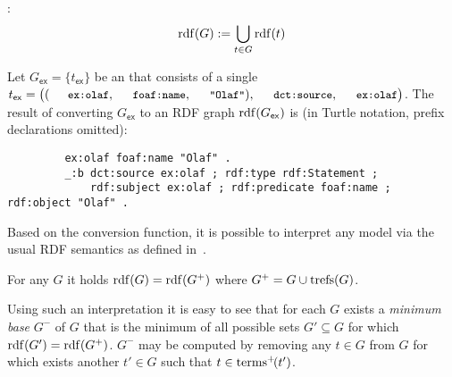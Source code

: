 \noindent
{}:
\begin{equation*}
	\mathrm{rdf}(G) := \bigcup_{t \in G} \mathrm{rdf}(t)
\end{equation*}

\begin{example} \label{Example:ConvertingRDFplusToRDF}
	Let $G_\mathsf{ex} = \lbrace t_\mathsf{ex} \rbrace$ be an {\RDFplusGraph} that consists of a single {\RDFplusTriple} $t_\mathsf{ex} = \bigl( (\mathTinyRDF{ex:olaf},\mathTinyRDF{foaf:name},\mathTinyRDF{"Olaf"}), \mathTinyRDF{dct:source}, \mathTinyRDF{ex:olaf} \bigr)$.
	The result of converting $G_\mathsf{ex}$ to an RDF graph $\mathrm{rdf}(G_\mathsf{ex})$ is (in Turtle notation, prefix declarations omitted):
	\begin{footnotesize}%
	\begin{verbatim}
		 ex:olaf foaf:name "Olaf" .
		 _:b dct:source ex:olaf ; rdf:type rdf:Statement ;
		     rdf:subject ex:olaf ; rdf:predicate foaf:name ; rdf:object "Olaf" .
	\end{verbatim}%
	\end{footnotesize}
\end{example}

\noindent
Based on the conversion function, it is possible to interpret any {\RDFplus} model via the usual RDF semantics as defined in~\cite{Hayes04:RDFsemantics}.

\begin{proposition} \label{Proposition:JustificationForDataMinimality1}
	For any {\RDFplusGraph} $G$ it holds $\mathrm{rdf}(G) = \mathrm{rdf}(G^+)$ where $G^+ = G \cup \mathrm{trefs}(G)$.
\end{proposition}

Using such an interpretation it is easy to see that for each {\RDFplusGraph} $G$ exists a \emph{minimum base} $G^-$ of $G$ that is the minimum of all possible sets $G' \subseteq G$ for which $\mathrm{rdf}(G') = \mathrm{rdf}(G^+)$.
$G^-$ may be computed by removing any $t \in G$ from $G$ for which exists another $t' \in G$ such that $t \in \mathrm{terms}^+\!(t')$.

